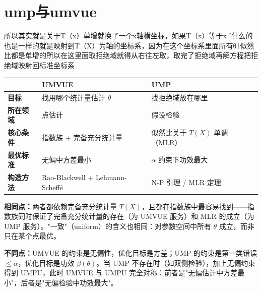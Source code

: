 \section{ump与umvue}
\begin{dxtips}
    所以其实就是关于T（x）单增就换了一个x轴横坐标，如果T（x）等于x ²什么的也是一样的就是映射到T（X）为轴的坐标系，因为在这个坐标系里面所有θ1似然比都是单增的所以在这里面取拒绝域就得从右往左取，取完了拒绝域再解方程把拒绝域映射回标准坐标系
\end{dxtips}
\begin{table}[h]
\centering
\begin{tabular}{lll}
\hline
 & \textbf{UMVUE} & \textbf{UMP} \\
\hline
\textbf{目标} & 找用哪个统计量估计 $\theta$ & 找拒绝域放在哪里 \\
\textbf{所在领域} & 点估计 & 假设检验 \\
\textbf{核心条件} & 指数族 + 完备充分统计量 & 似然比关于 $T(X)$ 单调（MLR） \\
\textbf{最优标准} & 无偏中方差最小 & $\alpha$ 约束下功效最大 \\
\textbf{构造方法} & Rao-Blackwell + Lehmann-Scheff\'{e} & N-P 引理 / MLR 定理 \\
\hline
\end{tabular}
\end{table}

\begin{dxtips}
    \textbf{相同点：}两者都依赖完备充分统计量 $T(X)$，且都在指数族中最容易找到——指数族同时保证了完备充分统计量的存在（为 UMVUE 服务）和 MLR 的成立（为 UMP 服务）。"一致"（uniform）的含义也相同：对参数空间中所有 $\theta$ 成立，而非只在某个点最优。

    \textbf{不同点：}UMVUE 的约束是无偏性，优化目标是方差；UMP 的约束是第一类错误 $\leq \alpha$，优化目标是功效 $\beta(\theta)$。当 UMP 不存在时（如双侧检验），加上无偏约束得到 UMPU，此时 UMVUE 与 UMPU 完全对称：前者是"无偏估计中方差最小"，后者是"无偏检验中功效最大"。
\end{dxtips}
